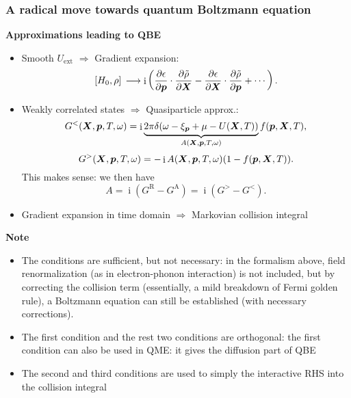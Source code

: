 \documentclass[t]{beamer}
\DeclareMathOperator{\ii}{i}
\begin{document}
\begin{frame}[allowframebreaks]
\frametitle{A radical move towards quantum Boltzmann equation}

\textbf{Approximations leading to QBE} \begin{itemize}
    \item Smooth $U_{\text{ext}}$ $\Rightarrow$ Gradient expansion:
    \begin{equation}
        \comm*{H_0}{\rho} \longrightarrow \ii \left(
            \pdv{\epsilon}{\vb*{p}} \cdot \pdv{\tilde{\rho}}{\vb*{X}}
            - \pdv{\epsilon}{\vb*{X}} \cdot \pdv{\tilde{\rho}}{\vb*{p}} + \cdots
        \right).
    \end{equation}
    \item Weakly correlated states $\Rightarrow$ Quasiparticle approx.: 
    \begin{equation}
       G^<(\vb*{X}, \vb*{p}, T, \omega) = 
       \ii \underbrace{2 \pi \delta(\omega - \xi_{\vb*{p}} + \mu - U(\vb*{X}, T))}_{A(\vb*{X}, \vb*{p}, T, \omega)} 
       f(\vb*{p}, \vb*{X}, T),
       \label{eq:qpa}
    \end{equation}
    \begin{equation}
        G^>(\vb*{X}, \vb*{p}, T, \omega) = - \ii A(\vb*{X}, \vb*{p}, T, \omega)
        (1 - f(\vb*{p}, \vb*{X}, T)).
    \end{equation}
    This makes sense: we then have 
    \begin{equation}
        A = \ii (G^{\text{R}} - G^{\text{A}}) = \ii (G^> - G^<).
    \end{equation}

    \item Gradient expansion in time domain $\Rightarrow$ Markovian collision integral
\end{itemize}    

\framebreak

\textbf{Note} \begin{itemize}
    \item The conditions are sufficient, but not necessary: 
        in the formalism above, field renormalization
        (as in electron-phonon interaction) is not included, 
        but by correcting the collision term 
        (essentially, a mild breakdown of Fermi golden rule),
        a Boltzmann equation can still be established
        (with necessary corrections).
    \item The first condition and the rest two conditions are orthogonal:
        the first condition can also be used in QME: 
        it gives the diffusion part of QBE
    \item The second and third conditions are used to 
        simply the interactive RHS into 
        the collision integral
\end{itemize} 


\end{frame}
\end{document}

